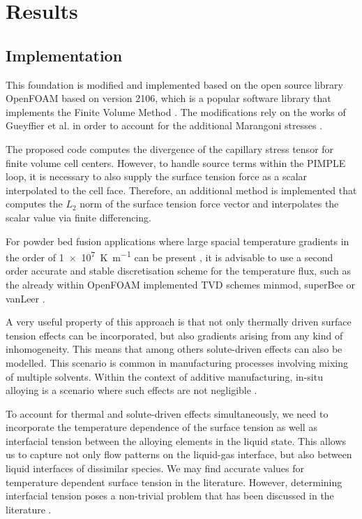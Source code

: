 \documentclass[conference,final]{IEEEtran}
\begin{document}
\section{Results}

\subsection{Implementation}

This foundation is modified and implemented based on the open source library OpenFOAM based on version 2106, which is a popular software library that implements the Finite Volume Method \cite{jasakOpenFOAMLibraryComplex2007}. The modifications rely on the works of Gueyffier et al. in order to account for the additional Marangoni stresses \cite{gueyffierVolumeofFluidInterfaceTracking1999}.

The proposed code computes the divergence of the capillary stress tensor for finite volume cell centers. However, to handle source terms within the PIMPLE loop, it is necessary to also supply the surface tension force as a scalar interpolated to the cell face. Therefore, an additional method is implemented that computes the $L_2$ norm of the surface tension force vector and interpolates the scalar value via finite differencing.

For powder bed fusion applications where large spacial temperature gradients in the order of \SI[per-mode=fraction]{1e7}{\kelvin \per \metre} can be present \cite{hooperMeltPoolTemperature2018}, it is advisable to use a second order accurate and stable discretisation scheme for the temperature flux, such as the already within OpenFOAM implemented TVD schemes minmod, superBee or vanLeer \cite{roeCharacteristicBasedSchemesEuler1986,vanleerUltimateConservativeDifference1974}.

A very useful property of this approach is that not only thermally driven surface tension effects can be incorporated, but also gradients arising from any kind of inhomogeneity. This means that among others solute-driven effects can also be modelled. This scenario is common in manufacturing processes involving mixing of multiple solvents. Within the context of additive manufacturing, in-situ alloying is a scenario where such effects are not negligible \cite{katz-demyanetzInsituAlloyingNovel2020}.

To account for thermal and solute-driven effects simultaneously, we need to incorporate the temperature dependence of the surface tension as well as interfacial tension between the alloying elements in the liquid state. This allows us to capture not only flow patterns on the liquid-gas interface, but also between liquid interfaces of dissimilar species. We may find accurate values for temperature dependent surface tension in the literature. However, determining interfacial tension poses a non-trivial problem that has been discussed in the literature \cite{marmurCorrelatingInterfacialTensions2010}.
\end{document}
